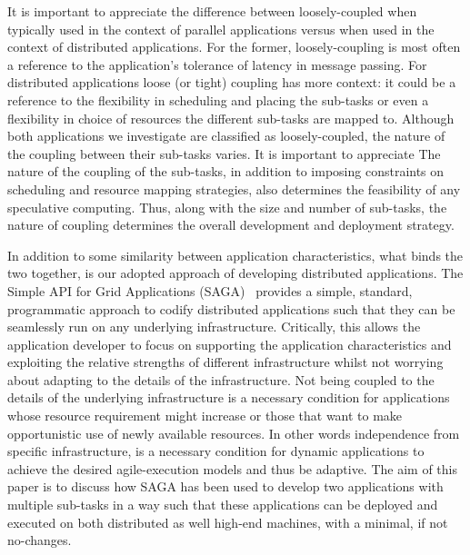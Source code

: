 \documentclass{llncs}
\begin{document}
It is important to appreciate the difference between
loosely-coupled when typically used in the context of parallel
applications versus when used in the context of distributed
applications. For the former, loosely-coupling is most often a
reference to the application's tolerance of latency in message
passing. For distributed applications loose (or tight) coupling has
more context: it could be a reference to the flexibility in scheduling
and placing the sub-tasks or even a flexibility in choice of resources
the different sub-tasks are mapped to. Although both applications we
investigate are classified as loosely-coupled, the nature of the
coupling between their sub-tasks varies. It is important to appreciate
The nature of the coupling of the sub-tasks, in addition to imposing
constraints on scheduling and resource mapping strategies, also
determines the feasibility of any speculative computing.  Thus, along
with the size and number of sub-tasks, the nature of coupling
determines the overall development and deployment strategy.



In addition to some similarity between application characteristics,
what binds the two together, is our adopted approach of developing
distributed applications. The Simple API for Grid Applications
(SAGA)~\cite{saga_url} provides a simple, standard, programmatic
approach to codify distributed applications such that they can be
seamlessly run on any underlying infrastructure. Critically, this
allows the application developer to focus on supporting the
application characteristics and exploiting the relative strengths of
different infrastructure whilst not worrying about adapting to the
details of the infrastructure. Not being coupled to the
details of the underlying infrastructure is a necessary condition for
applications whose resource requirement might increase or those that
want to make opportunistic use of newly available resources. In
other words independence from specific infrastructure, is a necessary
condition for dynamic applications to achieve the desired
agile-execution models and thus be adaptive.  The aim of this paper is
to discuss how SAGA has been used to develop two applications with
multiple sub-tasks in a way such that these applications can be
deployed and executed on both distributed as well high-end machines,
with a minimal, if not no-changes.
\end{document}

